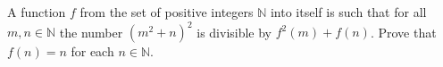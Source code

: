 A function $f$ from the set of positive integers $\mathbb{N}$ into itself is such that for all $m, n \in \mathbb{N}$ the number $(m^2 + n)^2$ is divisible by $f^2(m) + f(n)$. Prove that $f(n) = n$ for each $n \in \mathbb{N}$.

